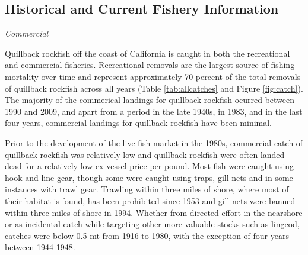 \documentclass[11pt,
  english,
  a4paper,
]{article}
\begin{document}

\hypertarget{historical-and-current-fishery-information}{%
\subsection{Historical and Current Fishery Information}\label{historical-and-current-fishery-information}}

\leavevmode\tagmcend\tagstructend


\emph{Commercial}

\leavevmode\tagmcend\tagstructend\par


Quillback rockfish off the coast of California is caught in both the recreational and commercial fisheries. Recreational removals are the largest source of fishing mortality over time and represent approximately 70 percent of the total removals of quillback rockfish across all years (Table \ref{tab:allcatches} and Figure \ref{fig:catch}). The majority of the commerical landings for quillback rockfish ocurred between 1990 and 2009, and apart from a period in the late 1940s, in 1983, and in the last four years, commercial landings for quillback rockfish have been minimal.

\leavevmode\tagmcend\tagstructend\par


Prior to the development of the live-fish market in the 1980s, commercial catch of quillback rockfish was relatively low and quillback rockfish were often landed dead for a relatively low ex-vessel price per pound. Most fish were caught using hook and line gear, though some were caught using traps, gill nets and in some instances with trawl gear. Trawling within three miles of shore, where most of their habitat is found, has been prohibited since 1953 and gill nets were banned within three miles of shore in 1994. Whether from directed effort in the nearshore or as incidental catch while targeting other more valuable stocks such as lingcod, catches were below 0.5 mt from 1916 to 1980, with the exception of four years between 1944-1948.

\leavevmode\tagmcend\tagstructend\par

\end{document}
